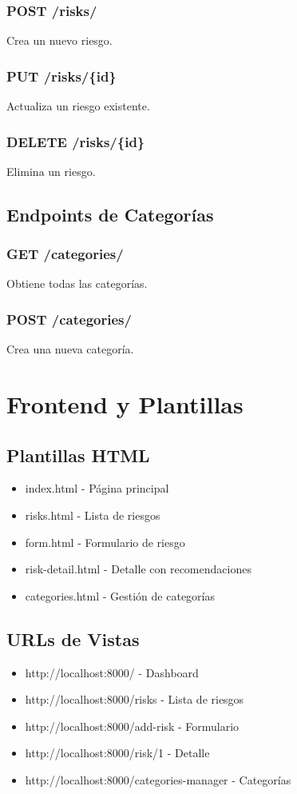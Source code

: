 \documentclass[12pt, a4paper, oneside]{article}
\begin{document}
\subsubsection{POST /risks/}
Crea un nuevo riesgo.

\subsubsection{PUT /risks/\{id\}}
Actualiza un riesgo existente.

\subsubsection{DELETE /risks/\{id\}}
Elimina un riesgo.

\subsection{Endpoints de Categorías}

\subsubsection{GET /categories/}
Obtiene todas las categorías.

\subsubsection{POST /categories/}
Crea una nueva categoría.

\section{Frontend y Plantillas}

\subsection{Plantillas HTML}
\begin{itemize}
    \item index.html - Página principal
    \item risks.html - Lista de riesgos
    \item form.html - Formulario de riesgo
    \item risk-detail.html - Detalle con recomendaciones
    \item categories.html - Gestión de categorías
\end{itemize}

\subsection{URLs de Vistas}
\begin{itemize}
    \item http://localhost:8000/ - Dashboard
    \item http://localhost:8000/risks - Lista de riesgos
    \item http://localhost:8000/add-risk - Formulario
    \item http://localhost:8000/risk/1 - Detalle
    \item http://localhost:8000/categories-manager - Categorías
\end{itemize}
\end{document}

